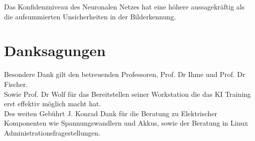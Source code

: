 \documentclass[conference]{IEEEtran}
\begin{document}
Das Konfidenzniveau des Neuronalen Netzes hat eine höhere aussagekräftig 
als die aufsummierten Unsicherheiten in der Bilderkennung.

	
\section*{Danksagungen}

Besondere Dank gilt den betreuenden Professoren, Prof. Dr Ihme und Prof. 
Dr Fischer.\\
Sowie Prof. Dr Wolf für das Bereitstellen seiner Workstation die das KI 
Training erst effektiv möglich macht hat.\\
Des weiten Gebührt
 J. Konrad Dank für die Beratung zu Elektrischer 
Komponenten wie Spannungswandlern und Akkus, sowie der Beratung in 
Linux Administrationsfragestellungen.

	\printbibheading
	\printbibliography[filter=wissenschaftlich, heading=subbibliography, title={Fachliteratur}]
	\printbibliography[filter=nichtWissenschaftlich, heading=subbibliography, title={Web-Dokumente}]
	
\end{document}
